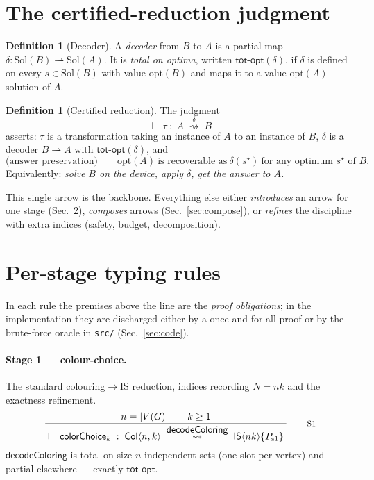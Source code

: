 \documentclass[11pt]{article}
\theoremstyle{definition}
\newtheorem{definition}[theorem]{Definition}
\newcommand{\rn}[1]{\textsc{\footnotesize #1}}
\newcommand{\irule}[2]{\ensuremath{\dfrac{\;#1\;}{\;#2\;}}}
\newcommand{\redto}[1]{\mathrel{\overset{\textstyle #1}{\rightsquigarrow}}}
\newcommand{\Col}{\mathsf{Col}}
\newcommand{\IS}{\mathsf{IS}}
\newcommand{\Sol}{\mathrm{Sol}}
\newcommand{\totopt}{\mathsf{tot\text{-}opt}}
\begin{document}
\section{The certified-reduction judgment}
\label{sec:judgment}

\begin{definition}[Decoder]
A \emph{decoder} from $B$ to $A$ is a partial map $\delta:\Sol(B)\rightharpoonup\Sol(A)$.
It is \emph{total on optima}, written $\totopt(\delta)$, if $\delta$ is defined on
every $s\in\Sol(B)$ with value $\mathrm{opt}(B)$ and maps it to a value-$\mathrm{opt}(A)$
solution of $A$.
\end{definition}

\begin{definition}[Certified reduction]
The judgment
\[
  \vdash\ \tau \;:\; A \;\redto{\delta}\; B
\]
asserts: $\tau$ is a transformation taking an instance of $A$ to an instance of
$B$, $\delta$ is a decoder $B\!\rightharpoonup\!A$ with $\totopt(\delta)$, and
\[
  \text{(answer preservation)}\qquad
  \mathrm{opt}(A)\ \text{is recoverable as}\ \delta(s^\star)\ \text{for any optimum } s^\star \text{ of } B .
\]
Equivalently: \emph{solve $B$ on the device, apply $\delta$, get the answer to $A$.}
\end{definition}

This single arrow is the backbone. Everything else either \emph{introduces} an
arrow for one stage (Sec.~\ref{sec:stages}), \emph{composes} arrows
(Sec.~\ref{sec:compose}), or \emph{refines} the discipline with extra indices
(safety, budget, decomposition).

\section{Per-stage typing rules}
\label{sec:stages}

In each rule the premises above the line are the \emph{proof obligations}; in the
implementation they are discharged either by a once-and-for-all proof or by the
brute-force oracle in \texttt{src/} (Sec.~\ref{sec:code}).

\paragraph{Stage 1 --- colour-choice.} The standard colouring$\to$IS reduction,
indices recording $N=nk$ and the exactness refinement.
\[
  \irule{n=|V(G)| \qquad k\ge 1}
        {\vdash\ \mathsf{colorChoice}_k \;:\; \Col\langle n,k\rangle
          \;\redto{\mathsf{decodeColoring}}\; \IS\langle nk\rangle\{P_{\mathrm{s1}}\}}
  \qquad\rn{S1}
\]
$\mathsf{decodeColoring}$ is total on size-$n$ independent sets (one slot per
vertex) and partial elsewhere --- exactly $\totopt$.
\end{document}
